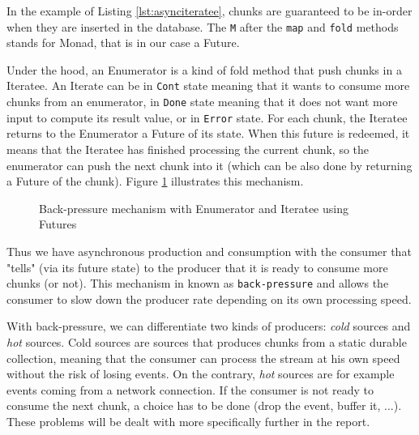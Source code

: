 In the example of Listing \ref{lst:asynciteratee}, chunks are guaranteed to be in-order when they are inserted in the database. The \verb|M| after
the \verb|map| and \verb|fold| methods stands for Monad, that is in our case a Future.

Under the hood, an Enumerator is a kind of fold method that push chunks in a Iteratee. An Iterate can be in \verb|Cont| state meaning that it wants to consume more 
chunks from an enumerator, in \verb|Done| state
meaning that it does not want more input to compute its result value, or in \verb|Error| state. For each chunk, the Iteratee returns to the Enumerator
a Future of its state. When this future is redeemed, it means that the Iteratee has finished processing the current chunk, so the enumerator can 
push the next chunk into it (which can be also done by returning a Future of the chunk). Figure \ref{fig:itenum} illustrates this mechanism.

\begin{figure}[h]
  \begin{center} 
    \caption{Back-pressure mechanism with Enumerator and Iteratee using Futures}
    \label{fig:itenum}
  \end{center}
\end{figure}

Thus we have asynchronous production and consumption with the consumer that "tells" (via its future state) to the producer that it is ready to 
consume more chunks (or not). This mechanism in known as \verb|back-pressure| and allows the consumer to slow down the producer rate depending on its 
own processing speed. 

With back-pressure, we can differentiate two kinds of producers: \textit{cold} sources and \textit{hot} sources. Cold sources are sources that
produces chunks from a static durable collection, meaning that the consumer can process the stream at his own speed without the risk of losing events.
On the contrary, \textit{hot} sources are for example events coming from a network connection. If the consumer is not ready to consume the next chunk,
a choice has to be done (drop the event, buffer it, ...). These problems will be dealt with more specifically further in the report.
\\

